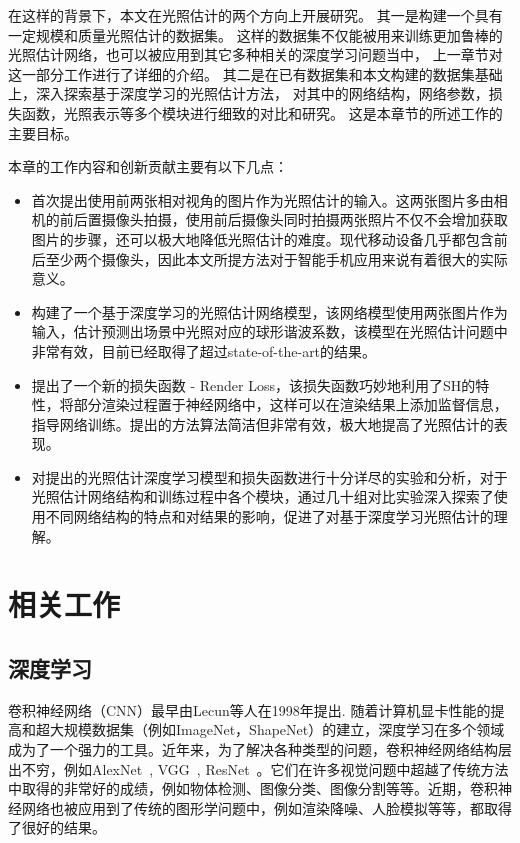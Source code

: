 在这样的背景下，本文在光照估计的两个方向上开展研究。
其一是构建一个具有一定规模和质量光照估计的数据集。
这样的数据集不仅能被用来训练更加鲁棒的光照估计网络，也可以被应用到其它多种相关的深度学习问题当中，
上一章节对这一部分工作进行了详细的介绍。
其二是在已有数据集和本文构建的数据集基础上，深入探索基于深度学习的光照估计方法，
对其中的网络结构，网络参数，损失函数，光照表示等多个模块进行细致的对比和研究。
这是本章节的所述工作的主要目标。

本章的工作内容和创新贡献主要有以下几点：
\begin{itemize}
    \item 首次提出使用前两张相对视角的图片作为光照估计的输入。这两张图片多由相机的前后置摄像头拍摄，使用前后摄像头同时拍摄两张照片不仅不会增加获取图片的步骤，还可以极大地降低光照估计的难度。现代移动设备几乎都包含前后至少两个摄像头，因此本文所提方法对于智能手机应用来说有着很大的实际意义。
    \item 构建了一个基于深度学习的光照估计网络模型，该网络模型使用两张图片作为输入，估计预测出场景中光照对应的球形谐波系数，该模型在光照估计问题中非常有效，目前已经取得了超过state-of-the-art的结果。
    \item 提出了一个新的损失函数 - Render Loss，该损失函数巧妙地利用了SH的特性，将部分渲染过程置于神经网络中，这样可以在渲染结果上添加监督信息，指导网络训练。提出的方法算法简洁但非常有效，极大地提高了光照估计的表现。
    \item 对提出的光照估计深度学习模型和损失函数进行十分详尽的实验和分析，对于光照估计网络结构和训练过程中各个模块，通过几十组对比实验深入探索了使用不同网络结构的特点和对结果的影响，促进了对基于深度学习光照估计的理解。
\end{itemize}

\section{相关工作}
\subsection{深度学习}
卷积神经网络（CNN）最早由Lecun等人\cite{lecun1998gradient}在1998年提出. 随着计算机显卡性能的提高和超大规模数据集（例如ImageNet\cite{deng2009imagenet}，ShapeNet\cite{chang2015shapenet}）的建立，深度学习在多个领域成为了一个强力的工具。近年来，为了解决各种类型的问题，卷积神经网络结构层出不穷，例如AlexNet~\cite{krizhevsky2012imagenet}, VGG~\cite{simonyan2014very}, ResNet~\cite{he2016deep}。它们在许多视觉问题中超越了传统方法中取得的非常好的成绩，例如物体检测\cite{girshick2014rich}、图像分类\cite{krizhevsky2012imagenet}、图像分割\cite{ronneberger2015u}等等。近期，卷积神经网络也被应用到了传统的图形学问题中，例如渲染降噪\cite{chaitanya2017interactive}、人脸模拟\cite{karras2017audio}等等，都取得了很好的结果。
